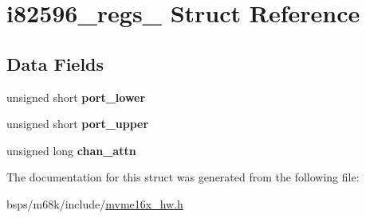\hypertarget{structi82596__regs__}{}\section{i82596\+\_\+regs\+\_\+ Struct Reference}
\label{structi82596__regs__}
\subsection*{Data Fields}
\begin{DoxyCompactItemize}
\item 
\mbox{\label{structi82596__regs___ae531dfb5ab76bc55b1042f7e119579ac}} 
unsigned short {\bfseries port\+\_\+lower}
\item 
\mbox{\label{structi82596__regs___afad5fc1081d3cb6ebde79104a65b78c2}} 
unsigned short {\bfseries port\+\_\+upper}
\item 
\mbox{\label{structi82596__regs___ab1246f4fd7f57e9001155ab3ff6c3868}} 
unsigned long {\bfseries chan\+\_\+attn}
\end{DoxyCompactItemize}


The documentation for this struct was generated from the following file\+:\begin{DoxyCompactItemize}
\item 
bsps/m68k/include/\mbox{\hyperlink{mvme16x__hw_8h}{mvme16x\+\_\+hw.\+h}}\end{DoxyCompactItemize}

